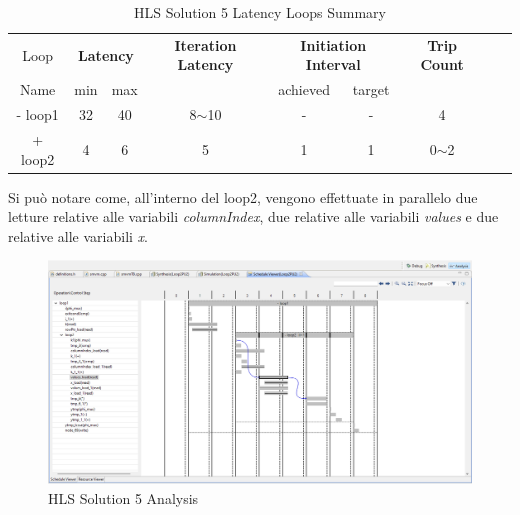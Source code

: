 \begin{table}[H]
	\centering
	\begin{tabular}{|c|c|c|c|c|c|c|c|c|}
		\hline
		\multicolumn{1}{|c|}{Loop} & \multicolumn{2}{|c|}{\textbf{Latency}} & \multicolumn{1}{c|}{\textbf{Iteration Latency}} & \multicolumn{2}{c|}{\textbf{Initiation Interval}} & \multicolumn{1}{c|}{\textbf{Trip Count}}  \\
		Name & min & max &  & achieved & target &  \\
		\hline
		- loop1 & 32 & 40 & 8$\sim$10 & - & - & 4 \\
		+ loop2 & 4 & 6 & 5 & 1 & 1 & 0$\sim$2 \\
		\hline
	\end{tabular}
	\caption{HLS Solution 5 Latency Loops Summary}
	\label{tab:hls-solution-5-loop-summary}
\end{table}

Si può notare come, all'interno del loop2, vengono effettuate in parallelo due letture relative alle variabili \textit{columnIndex}, due relative alle variabili \textit{values} e due relative alle variabili \textit{x}. 

\begin{figure}[H]
	\centering
	\includegraphics[width=1\textwidth]{solutions/s5/s5analysis.png}
	\caption{HLS Solution 5 Analysis}
\end{figure}

